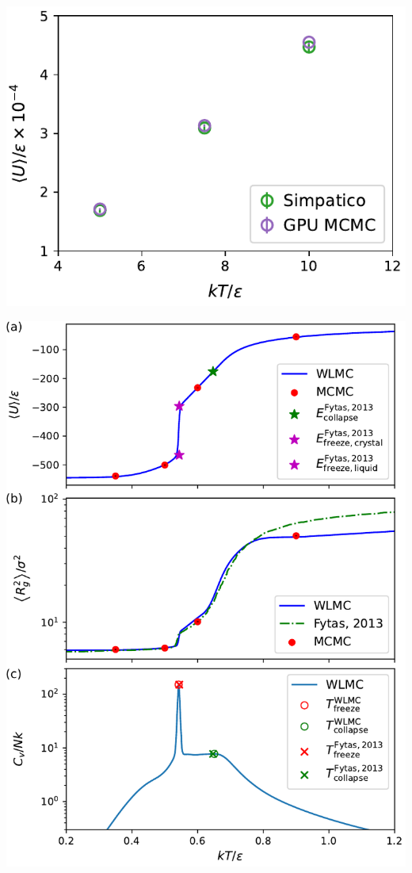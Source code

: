 \documentclass[aspectratio=169]{beamer}
\begin{document}
\begin{frame}[c]{}

  \centering
  \includegraphics[height=\textheight]{../figures/ch3_gpu/fig-accuracy/fig-accuracy.pdf}

\end{frame}

\begin{frame}[c]{}

  \centering
  \includegraphics[height=\textheight]{../figures/ch3_gpu/fig-Fytas_MC_WL_replicate/fig-Fytas_MC_WL_replicate}

\end{frame}
\end{document}
